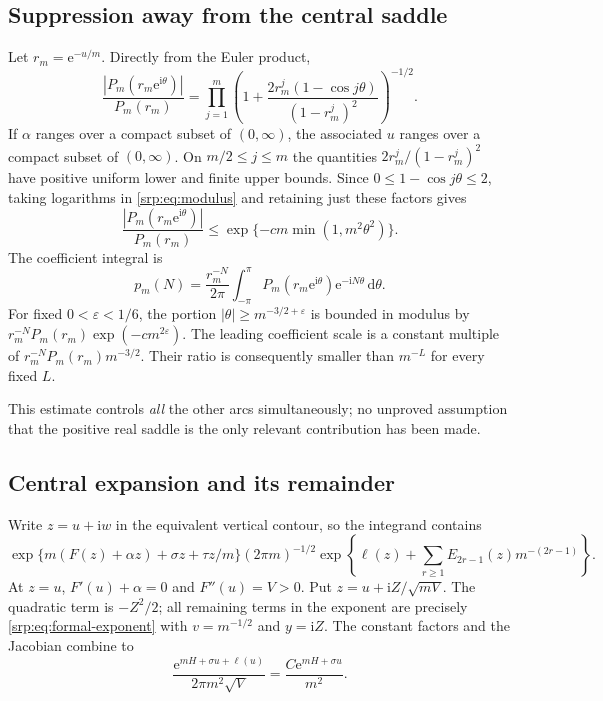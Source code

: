 \documentclass[11pt,a4paper]{article}
\numberwithin{equation}{section}
\theoremstyle{definition}
\theoremstyle{remark}
\newcommand{\dd}{\,\mathrm d}
\newcommand{\e}{\mathrm e}
\newcommand{\ii}{\mathrm i}
\begin{document}
\subsection{Suppression away from the central saddle}
Let $r_m=\e^{-u/m}$. Directly from the Euler product,
\begin{equation}
 \frac{|P_m(r_m\e^{\ii\theta})|}{P_m(r_m)}
 =\prod_{j=1}^m
 \left(1+
 \frac{2r_m^j(1-\cos j\theta)}{(1-r_m^j)^2}\right)^{-1/2}.
 \label{srp:eq:modulus}
\end{equation}
If $\alpha$ ranges over a compact subset of $(0,\infty)$, the associated
$u$ ranges over a compact subset of $(0,\infty)$. On
$m/2\le j\le m$ the quantities
$2r_m^j/(1-r_m^j)^2$ have positive uniform lower and finite upper bounds.
Since $0\le1-\cos j\theta\le2$, taking logarithms in
\eqref{srp:eq:modulus} and retaining just these factors gives
\begin{equation}
 \frac{|P_m(r_m\e^{\ii\theta})|}{P_m(r_m)}
 \le\exp\{-c m\min(1,m^2\theta^2)\}.
 \label{srp:eq:minor-arcs}
\end{equation}
The coefficient integral is
\begin{equation}
 p_m(N)=\frac{r_m^{-N}}{2\pi}
 \int_{-\pi}^{\pi}P_m(r_m\e^{\ii\theta})\e^{-\ii N\theta}\dd\theta.
 \label{srp:eq:cauchy}
\end{equation}
For fixed $0<\varepsilon<1/6$, the portion
$|\theta|\ge m^{-3/2+\varepsilon}$ is bounded in modulus by
$r_m^{-N}P_m(r_m)\exp(-c m^{2\varepsilon})$. The leading coefficient
scale is a constant multiple of
$r_m^{-N}P_m(r_m)m^{-3/2}$. Their ratio is consequently smaller than
$m^{-L}$ for every fixed $L$.

This estimate controls \emph{all} the other arcs simultaneously; no
unproved assumption that the positive real saddle is the only relevant
contribution has been made.

\subsection{Central expansion and its remainder}
Write $z=u+\ii w$ in the equivalent vertical contour, so the integrand
contains
\[
 \exp\{m(F(z)+\alpha z)+\sigma z+\tau z/m\}
 (2\pi m)^{-1/2}\exp\left\{\ell(z)+
 \sum_{r\ge1}E_{2r-1}(z)m^{-(2r-1)}\right\}.
\]
At $z=u$, $F'(u)+\alpha=0$ and $F''(u)=V>0$. Put
$z=u+\ii Z/\sqrt{mV}$. The quadratic term is $-Z^2/2$; all remaining
terms in the exponent are precisely \eqref{srp:eq:formal-exponent} with
$v=m^{-1/2}$ and $y=\ii Z$. The constant factors and the Jacobian combine
to
\[
 \frac{\e^{mH+\sigma u+\ell(u)}}{2\pi m^2\sqrt V}
 =\frac{C\e^{mH+\sigma u}}{m^2}.
\]
\end{document}
